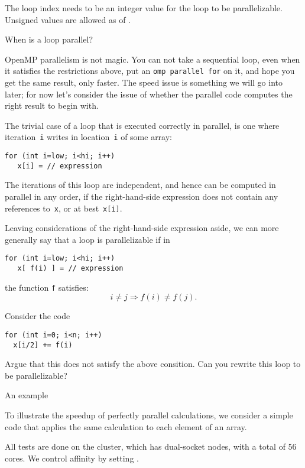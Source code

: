 \begin{remark}
  The loop index needs to be an integer value
  for the loop to be parallelizable.
  Unsigned values are allowed as of .
\end{remark}

 {When is a loop parallel?}

OpenMP parallelism is not magic. You can not take a sequential loop,
even when it satisfies the restrictions above,
put an \lstinline{omp parallel for} on it,
and hope you get the same result, only faster.
The speed issue is something we will go into later;
for now let's consider the issue of whether the parallel
code computes the right result to begin with.

The trivial case of a loop that is executed correctly in parallel,
is one where iteration~\lstinline{i} writes in location~\lstinline{i}
of some array:
\begin{lstlisting}
for (int i=low; i<hi; i++)
   x[i] = // expression
\end{lstlisting}
The iterations of this loop are independent,
and hence can be computed in parallel in any order,
if the right-hand-side expression does not contain
any references to~\lstinline{x},
or at best~\lstinline{x[i]}.

Leaving considerations of the right-hand-side expression aside,
we can more generally say that a loop is parallelizable if in
\begin{lstlisting}
for (int i=low; i<hi; i++)
   x[ f(i) ] = // expression
\end{lstlisting}
the function \lstinline{f} satisfies:
\[ i\not=j \Rightarrow f(i)\not=f(j). \]

\begin{exercise}
  \label{sl:omp:loop-over-2}
  Consider the code
\begin{lstlisting}
for (int i=0; i<n; i++)
  x[i/2] += f(i)
\end{lstlisting}
  Argue that this does not satisfy the above consition.
  Can you rewrite this loop to be parallelizable?
\end{exercise}

 {An example}

To illustrate the speedup of perfectly parallel calculations,
we consider a simple code that applies the same calculation
to each element of an array.

All tests are done on the  cluster,
which has dual-socket  nodes,
with a total of 56 cores.
We control affinity by setting
.

